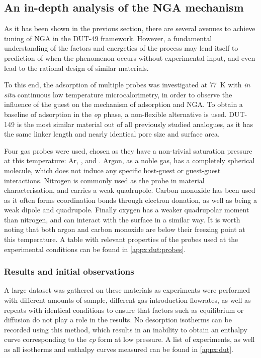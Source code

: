 
\subsection{An in-depth analysis of the NGA mechanism}%
\label{dut:indepth}

As it has been shown in the previous section, there are 
several avenues to achieve tuning of \gls{NGA} in the DUT-49 framework.
However, a fundamental understanding of the factors and 
energetics of the process may lend itself to prediction of
when the phenomenon occurs without 
experimental input, and even lead to the rational design of 
similar materials.

To this end, the adsorption of multiple probes was investigated 
at \SI{77}{\kelvin} with \textit{in situ} continuous low 
temperature microcalorimetry,
in order to observe the influence of the guest on the mechanism of
adsorption and \gls{NGA}. To obtain a baseline of adsorption in 
the \textit{op} phase, a non-flexible alternative is used. 
DUT-149 is the most similar material out of all previously studied
analogues, as it has the same linker length and nearly identical pore
size and surface area.

Four gas probes were used, chosen as they 
have a non-trivial saturation pressure at this temperature: Ar,
,  and . Argon, as a 
noble gas, has a completely spherical molecule, which does not 
induce any specific host-guest or guest-guest interactions. Nitrogen
is commonly used as the probe in material characterisation, 
and carries a weak quadrupole. Carbon monoxide has been used 
as it often forms coordination bonds through electron donation,
as well as being a weak dipole and quadrupole.
Finally oxygen has a weaker quadrupolar moment than 
nitrogen, and can interact with the surface in a similar way.
It is worth noting that both argon and carbon monoxide are below 
their freezing point at this temperature. A table with 
relevant properties of the probes used at the experimental
conditions can be found in \autoref{appx:dut:probes}.

\subsubsection{Results and initial observations}

A large dataset was gathered
on these materials as experiments were performed with different 
amounts of sample, different gas introduction flowrates, as well as repeats
with identical conditions to ensure that factors such as 
equilibrium or diffusion do not play a role in the results. 
No desorption isotherms can be recorded using this method, which
results in an inability to obtain an enthalpy curve corresponding 
to the \textit{cp} form at low pressure. A list 
of experiments, as well as all isotherms and enthalpy curves measured can
be found in \autoref{appx:dut}.

